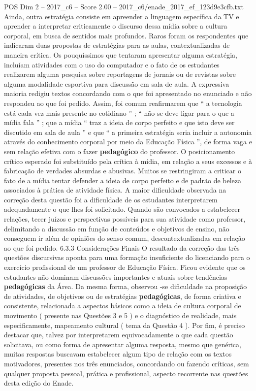 \begin{textsample}{POS Dim 2 – 2017\_c6 – Score 2.00 – 2017\_c6/enade\_2017\_ef\_123d9e3cfb.txt}
Ainda, outra estratégia consiste em apreender a linguagem específica da TV e aprender a interpretar criticamente o discurso dessa mídia sobre a cultura corporal, em busca de sentidos mais profundos.
Raros foram os respondentes que indicaram duas propostas de estratégias para as aulas, contextualizadas de maneira crítica.
Os pouquíssimos que tentaram apresentar alguma estratégia, incluíam atividades com o uso do computador e o fato de os estudantes realizarem alguma pesquisa sobre reportagens de jornais ou de revistas sobre alguma modalidade esportiva para discussão em sala de aula.
A expressiva maioria redigiu textos concordando com o que foi apresentado no enunciado e não respondeu ao que foi pedido.
Assim, foi comum reafirmarem que “ a tecnologia está cada vez mais presente no cotidiano ” ; “ não se deve ligar para o que a mídia fala ” ; que a mídia “ traz a ideia de corpo perfeito e que isto deve ser discutido em sala de aula ” e que “ a primeira estratégia seria incluir a autonomia através do conhecimento corporal por meio da Educação Física ”, de forma vaga e sem relação efetiva com o fazer \textbf{pedagógico} do professor.
O posicionamento crítico esperado foi substituído pela crítica à mídia, em relação a seus excessos e à fabricação de verdades absurdas e abusivas.
Muitos se restringiram a criticar o fato de a mídia tentar defender a ideia de corpo perfeito e de padrão de beleza associados à prática de atividade física.
A maior dificuldade observada na correção desta questão foi a dificuldade de os estudantes interpretarem adequadamente o que lhes foi solicitado.
Quando são convocados a estabelecer relações, tecer juízos e perspectivas possíveis para sua atividade como professor, delimitando a discussão em função de conteúdos e objetivos de ensino, não conseguem ir além de opiniões do senso comum, descontextualizadas em relação ao que foi pedido. 6.3.3 Considerações Finais O resultado da correção das três questões discursivas aponta para uma formação insuficiente do licenciando para o exercício profissional de um professor de Educação Física.
Ficou evidente que os estudantes não dominam discussões importantes e atuais sobre tendências \textbf{pedagógicas} da Área.
Da mesma forma, observou -se dificuldade na proposição de atividades, de objetivos ou de estratégias \textbf{pedagógicas}, de forma criativa e consistente, relacionada a aspectos básicos como a ideia de cultura corporal de movimento ( presente nas Questões 3 e 5 ) e o diagnóstico de realidade, mais especificamente, mapeamento cultural ( tema da Questão 4 ).
Por fim, é preciso destacar que, talvez por interpretarem equivocadamente o que cada questão solicitava, ou como forma de apresentar alguma resposta, mesmo que genérica, muitas respostas buscavam estabelecer algum tipo de relação com os textos motivadores, presentes nos três enunciados, concordando ou fazendo críticas, sem qualquer proposta pessoal, prática e profissional, aspecto recorrente nas questões desta edição do Enade.

\end{textsample}
